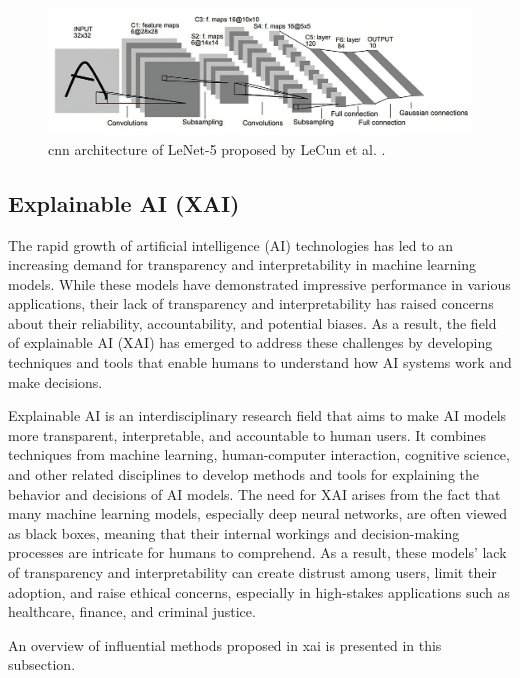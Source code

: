 \begin{figure}[htb]
    \centerline{
    \includegraphics[width=1.2\linewidth]{images/LeNet.jpeg}}
    \caption{\gls{cnn} architecture of LeNet-5 proposed by LeCun et al. \cite{lecunGradientbasedLearningApplied1998}.}
    \label{fig:lenet}
\end{figure} 

\subsection{Explainable AI (XAI)}

The rapid growth of artificial intelligence (AI) technologies has led to an increasing demand for transparency and interpretability in machine learning models. While these models have demonstrated impressive performance in various applications, their lack of transparency and interpretability has raised concerns about their reliability, accountability, and potential biases. As a result, the field of explainable AI (XAI) has emerged to address these challenges by developing techniques and tools that enable humans to understand how AI systems work and make decisions.

Explainable AI is an interdisciplinary research field that aims to make AI models more transparent, interpretable, and accountable to human users. It combines techniques from machine learning, human-computer interaction, cognitive science, and other related disciplines to develop methods and tools for explaining the behavior and decisions of AI models. The need for XAI arises from the fact that many machine learning models, especially deep neural networks, are often viewed as black boxes, meaning that their internal workings and decision-making processes are intricate for humans to comprehend. As a result, these models' lack of transparency and interpretability can create distrust among users, limit their adoption, and raise ethical concerns, especially in high-stakes applications such as healthcare, finance, and criminal justice.

An overview of influential methods proposed in \gls{xai} is presented in this subsection.

